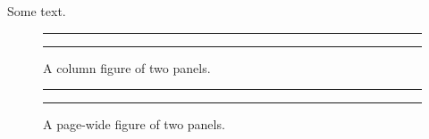 \documentclass[aps,twocolumn]{revtex4-1}
\begin{document}
Some text.

\begin{figure}
  \centering
  \rule{0.45\columnwidth}{1cm}
  \rule{0.45\columnwidth}{1cm}
  \caption{A column figure of two panels.}
\end{figure}
\begin{figure}
  \centering
  \rule{0.45\textwidth}{1cm}
  \rule{0.45\textwidth}{1cm}
  \caption{A page-wide figure of two panels.}
\end{figure}
\end{document}
